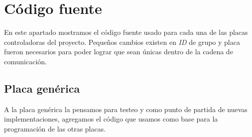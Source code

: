\section{C\'odigo fuente}
\label{hA_source}

En este apartado mostramos el c\'odigo fuente usado para cada una de las placas controladoras
del proyecto.
Peque\~nos cambios existen en \emph{ID} de grupo y placa fueron necesarios para poder lograr que sean
\'unicas dentro de la cadena de comunicaci\'on.

\subsection{Placa gen\'erica}
\label{hA_source_gen}

A la placa gen\'erica la pensamos para testeo y como punto de partida de nuevas
implementaciones, agregamos el c\'odigo que usamos como base para la programaci\'on de las otras
placas.

